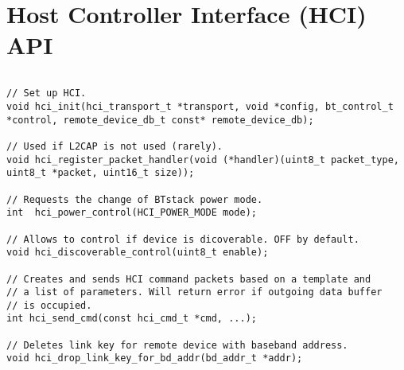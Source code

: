 \section{Host Controller Interface (HCI) API}
\label{appendix:api_hci}
$ $
\begin{lstlisting}
// Set up HCI.
void hci_init(hci_transport_t *transport, void *config, bt_control_t *control, remote_device_db_t const* remote_device_db);

// Used if L2CAP is not used (rarely). 
void hci_register_packet_handler(void (*handler)(uint8_t packet_type, uint8_t *packet, uint16_t size));

// Requests the change of BTstack power mode.
int  hci_power_control(HCI_POWER_MODE mode);

// Allows to control if device is dicoverable. OFF by default.
void hci_discoverable_control(uint8_t enable);

// Creates and sends HCI command packets based on a template and 
// a list of parameters. Will return error if outgoing data buffer 
// is occupied. 
int hci_send_cmd(const hci_cmd_t *cmd, ...);

// Deletes link key for remote device with baseband address.
void hci_drop_link_key_for_bd_addr(bd_addr_t *addr);
\end{lstlisting}
\pagebreak